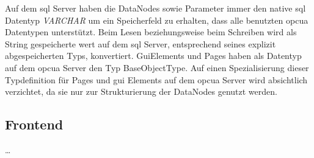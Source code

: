 Auf dem \ac{sql} Server haben die DataNodes sowie Parameter immer den native \ac{sql} Datentyp \emph{VARCHAR} um ein Speicherfeld zu erhalten, dass alle benutzten \ac{opcua} Datentypen unterstützt.
Beim Lesen beziehungsweise beim Schreiben wird als String gespeicherte wert auf dem \ac{sql} Server, 
entsprechend seines explizit abgespeicherten Typs, konvertiert. 
GuiElements und Pages haben als Datentyp auf dem \ac{opcua} Server den Typ BaseObjectType.
Auf einen Spezialisierung dieser Typdefinition für Pages und \ac{gui} Elements auf dem \ac{opcua} Server wird absichtlich verzichtet, 
da sie nur zur Strukturierung der DataNodes genutzt werden.


\subsection{Frontend}\label{subsec::dataFrontend}
\dots



